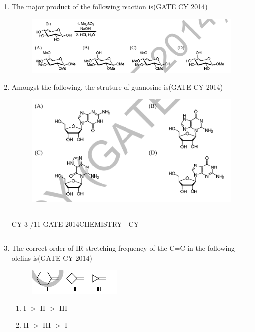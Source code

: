 \documentclass[a4paper,10pt]{exam}
\theoremstyle{remark}
\begin{document}
\begin{enumerate}
    \item The major product of the following reaction is\hfill{(GATE CY 2014)}
    \begin{figure}[H]
        \centering
        \includegraphics[width=0.9\columnwidth]{figs/Q 17.png}
        \caption{}
        \label{fig:placeholder}
    \end{figure}
\item Amongst the following, the struture of guanosine is\hfill{(GATE CY 2014)}
\begin{figure}[H]
    \centering
    \includegraphics[width=0.8\columnwidth]{figs/Q 18.png}
    \caption{}
    \label{fig:placeholder}
\end{figure}
\vfill
\noindent\rule{\linewidth}{0.4pt}
CY \hfill 3 /11
\newpage
GATE 2014\hfill CHEMISTRY - CY\\
\noindent\rule{\linewidth}{0.4pt}
\item The correct order of IR stretching frequency of the C=C in the following olefins is\hfill{(GATE CY 2014)}
\begin{figure}[H]
    \centering
    \includegraphics[width=0.4\columnwidth]{figs/Q 19.png}
    \caption{}
    \label{fig:placeholder}
\end{figure}
 \begin{multicols}{4}
    \begin{enumerate} 
        \item I      $>$ II      $>$ III
        \item II      $>$ III      $>$ I 

\end{enumerate}
\end{multicols}
\end{enumerate}
\end{document}
